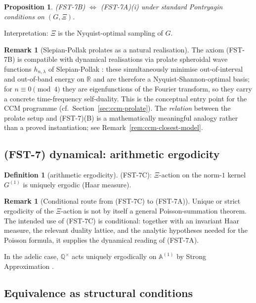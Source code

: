 \documentclass[11pt,a4paper]{article}
\theoremstyle{plain}
\newtheorem{proposition}[theorem]{Proposition}
\theoremstyle{definition}
\newtheorem{definition}[theorem]{Definition}
\newtheorem{remark}[theorem]{Remark}
\newcommand{\R}{\mathbb{R}}
\newcommand{\Q}{\mathbb{Q}}
\newcommand{\A}{\mathbb{A}}
\begin{document}
\begin{proposition}
\label{prop:B-iff-A}
(FST-7B) $\Leftrightarrow$ (FST-7A)(i) under standard Pontryagin
conditions on $(G, \Xi)$.
\end{proposition}

Interpretation: $\Xi$ is the Nyquist-optimal sampling of $G$.

\begin{remark}[Slepian-Pollak prolates as a natural realisation]
\label{rem:b-view-prolate}
The axiom (FST-7B) is compatible with dynamical realisations via
prolate spheroidal wave functions $h_{n,\lambda}$ of Slepian-Pollak
\cite{SlepianPollack1961}: these simultaneously minimise
out-of-interval and out-of-band energy on $\R$ and are therefore a
Nyquist-Shannon-optimal basis; for $n \equiv 0 \pmod 4$ they are
eigenfunctions of the Fourier transform, so they carry a concrete
time-frequency self-duality.  This is the conceptual entry point
for the CCM programme (cf.\ Section~\ref{sec:ccm-prolate}).  The
\emph{relation} between the prolate setup and (FST-7)(B) is a
mathematically meaningful analogy rather than a proved instantiation;
see Remark~\ref{rem:ccm-closest-model}.
\end{remark}

\subsection{(FST-7) dynamical: arithmetic ergodicity}

\begin{definition}[arithmetic ergodicity]
\label{def:fst7-c}
(FST-7C): $\Xi$-action on the norm-$1$ kernel $G^{(1)}$ is uniquely
ergodic (Haar measure).
\end{definition}

\begin{remark}[Conditional route from (FST-7C) to (FST-7A)]
\label{prop:C-implies-A}
Unique or strict ergodicity of the $\Xi$-action is not by itself a
general Poisson-summation theorem.  The intended use of (FST-7C) is
conditional: together with an invariant Haar measure, the relevant
duality lattice, and the analytic hypotheses needed for the Poisson
formula, it supplies the dynamical reading of (FST-7A).
\end{remark}

In the adelic case, $\Q^\times$ acts uniquely ergodically on
$\A^{(1)}$ by Strong Approximation \cite{CasselsFrohlich}.

\subsection{Equivalence as structural conditions}
\end{document}
